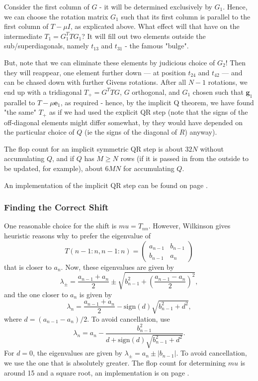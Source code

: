 \documentclass[11pt]{article}
\newcommand{\bmat}{\begin{pmatrix}}
\newcommand{\emat}{\end{pmatrix}}
\newcommand{\ve}[1]{\ensuremath{\mathbf{#1}}}
\newcommand{\sign}[1]{\ensuremath{\text{sign}(#1)}}
\begin{document}
Consider the first column of $G$ - it will be determined exclusively by $G_1$. Hence, we can choose the rotation matrix $G_1$ such that its first column is parallel to the first column of $T-\mu I$, as explicated above. What effect will that have on the intermediate $T_1 = G_1^T     T      G_1$? It will fill out two elements outside the sub/superdiagonals, namely $t_{13}$ and $t_{31}$ - the famous "bulge".

But, note that we can eliminate these elements by judicious choice of $G_2$! Then they will reappear, one element further down --- at position $t_{24}$ and $t_{42}$ --- and can be chased down with further Givens rotations. After all $N-1$ rotations, we end up with a tridiagonal $T_+ = G^TTG$, $G$ orthogonal, and $G_1$ chosen such that $\ve g_1$ parallel to $T-\mu \ve e_1$, as required - hence, by the implicit Q theorem, we have found "the same" $T_+$ as if we had used the explicit QR step (note that the signs of the off-diagonal elements might differ somewhat, by they would have depended on the particular choice of $Q$ (ie the signs of the diagonal of $R$) anyway). 

The flop count for an implicit symmetric QR step is about $32N$ without accumulating $Q$, and if $Q$ has $M\ge N$ rows (if it is passed in from the outside to be updated, for example), about $6MN$ for accumulating $Q$. 

An implementation of the implicit QR step can be found on page \pageref{rc:qrimstep}.

\subsubsection{Finding the Correct Shift}
One reasonable choice for the shift is $mu=T_{nn}$. However, Wilkinson gives heuristic reasons why to prefer the eigenvalue of 
\[
	T(n-1:n,n-1:n) = \bmat a_{n-1} & b_{n-1} \\ b_{n-1} & a_n \emat
\]
that is closer to $a_n$.
Now, these eigenvalues are given by 
\[
	\lambda_{\pm} = \frac{a_{n-1}+a_n}2 \pm \sqrt{b_{n-1}^2 + \left(\frac{a_{n-1}-a_n}2\right )^2},
\]
and the one closer to $a_n$ is given by
\[
	\lambda_{n} = \frac{a_{n-1}+a_n}2 - \sign d \sqrt{b_{n-1}^2 + d^2},
\]
where $d=(a_{n-1}-a_n)/2$. To avoid cancellation, use
\[
	\lambda_{n} = a_n - \frac{ b_{n-1}^2}{d + \sign d \sqrt{b_{n-1}^2 + d^2}}.
\]
For $d=0$, the eigenvalues are given by 	$\lambda_{\pm} = a_n \pm | b_{n-1}|$. To avoid cancellation, we use the one that is absolutely greater. The flop count for determining $mu$ is around 15 and a square root, an implementation is on page \pageref{rc:wilkinsonshift}.
\end{document}
